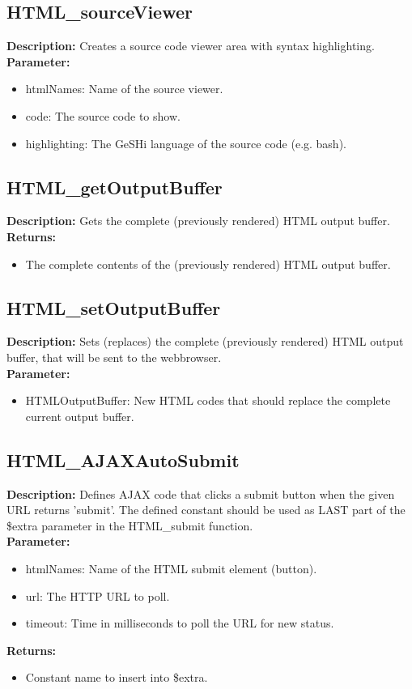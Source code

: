 \subsection{HTML\_sourceViewer}
\textbf{Description:} Creates a source code viewer area with syntax highlighting.\\
\textbf{Parameter:}
\begin{itemize}
\item htmlNames: Name of the source viewer.
\item code: The source code to show.
\item highlighting: The GeSHi language of the source code (e.g. bash).
\end{itemize}

\subsection{HTML\_getOutputBuffer}
\textbf{Description:} Gets the complete (previously rendered) HTML output buffer.\\
\textbf{Returns:}
\begin{itemize}
\item The complete contents of the (previously rendered) HTML output buffer.
\end{itemize}

\subsection{HTML\_setOutputBuffer}
\textbf{Description:} Sets (replaces) the complete (previously rendered) HTML output buffer, that will be sent to the webbrowser.\\
\textbf{Parameter:}
\begin{itemize}
\item HTMLOutputBuffer: New HTML codes that should replace the complete current output buffer.
\end{itemize}

\subsection{HTML\_AJAXAutoSubmit}
\textbf{Description:} Defines AJAX code that clicks a submit button when the given URL returns 'submit'. The defined constant should be used as LAST part of the \$extra parameter in the HTML\_submit function.\\
\textbf{Parameter:}
\begin{itemize}
\item htmlNames: Name of the HTML submit element (button).
\item url: The HTTP URL to poll.
\item timeout: Time in milliseconds to poll the URL for new status.
\end{itemize}
\textbf{Returns:}
\begin{itemize}
\item Constant name to insert into \$extra.
\end{itemize}

